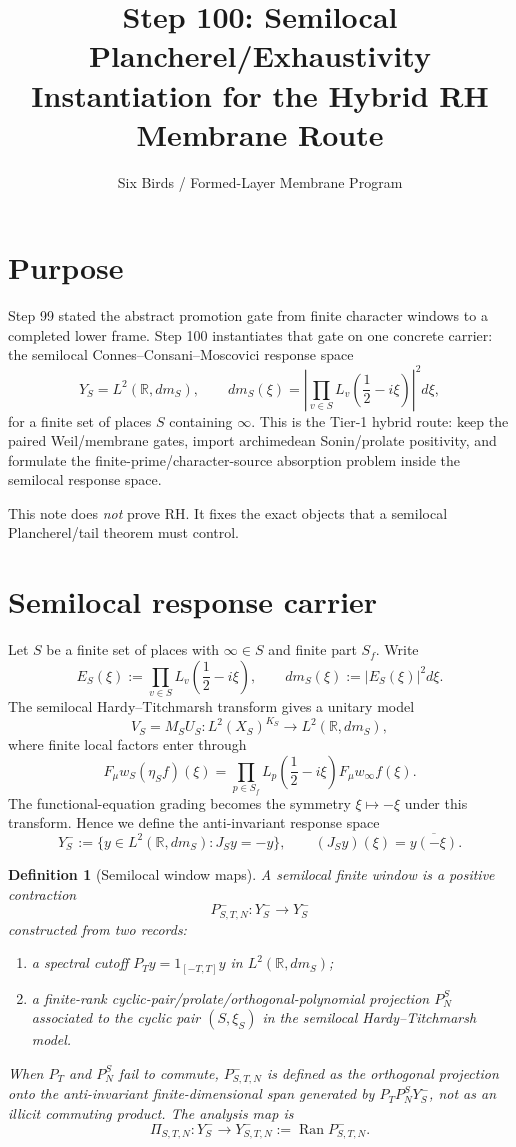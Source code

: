\documentclass[11pt]{article}
\title{Step 100: Semilocal Plancherel/Exhaustivity Instantiation for the Hybrid RH Membrane Route}
\author{Six Birds / Formed-Layer Membrane Program}
\date{}
\newtheorem{definition}{Definition}
\newcommand{\Y}{Y}
\newcommand{\R}{\mathbb R}
\newcommand{\Ran}{\operatorname{Ran}}
\begin{document}
\maketitle

\section{Purpose}
Step 99 stated the abstract promotion gate from finite character windows to a completed lower frame.  Step 100 instantiates that gate on one concrete carrier: the semilocal Connes--Consani--Moscovici response space
\[
  \Y_S=L^2(\R,dm_S),\qquad
  dm_S(\xi)=\left|\prod_{v\in S}L_v\left(\frac12-i\xi\right)\right|^2d\xi,
\]
for a finite set of places $S$ containing $\infty$.  This is the Tier-1 hybrid route: keep the paired Weil/membrane gates, import archimedean Sonin/prolate positivity, and formulate the finite-prime/character-source absorption problem inside the semilocal response space.

This note does \emph{not} prove RH.  It fixes the exact objects that a semilocal Plancherel/tail theorem must control.

\section{Semilocal response carrier}
Let $S$ be a finite set of places with $\infty\in S$ and finite part $S_f$.  Write
\[
  E_S(\xi):=\prod_{v\in S}L_v\left(\frac12-i\xi\right),
  \qquad dm_S(\xi):=|E_S(\xi)|^2d\xi.
\]
The semilocal Hardy--Titchmarsh transform gives a unitary model
\[
  V_S=M_SU_S:L^2(X_S)^{K_S}\longrightarrow L^2(\R,dm_S),
\]
where finite local factors enter through
\[
  F_\mu w_S(\eta_S f)(\xi)=\prod_{p\in S_f}L_p\left(\frac12-i\xi\right)F_\mu w_\infty f(\xi).
\]
The functional-equation grading becomes the symmetry $\xi\mapsto-\xi$ under this transform.  Hence we define the anti-invariant response space
\[
  \Y_S^-:=\{y\in L^2(\R,dm_S):J_Sy=-y\},
  \qquad (J_Sy)(\xi)=\overline{y(-\xi)}.
\]

\begin{definition}[Semilocal window maps]
A semilocal finite window is a positive contraction
\[
  P_{S,T,N}^-:\Y_S^-\to\Y_S^-
\]
constructed from two records:
\begin{enumerate}[label=(\roman*)]
\item a spectral cutoff $P_Ty=1_{[-T,T]}y$ in $L^2(\R,dm_S)$;
\item a finite-rank cyclic-pair/prolate/orthogonal-polynomial projection $P_N^S$ associated to the cyclic pair $(S,\xi_S)$ in the semilocal Hardy--Titchmarsh model.
\end{enumerate}
When $P_T$ and $P_N^S$ fail to commute, $P_{S,T,N}^-$ is defined as the orthogonal projection onto the anti-invariant finite-dimensional span generated by $P_TP_N^S\Y_S^-$, not as an illicit commuting product.
The analysis map is
\[
  \Pi_{S,T,N}:\Y_S^-\to \Y_{S,T,N}^-:=\Ran P_{S,T,N}^-.
\]
\end{definition}
\end{document}
